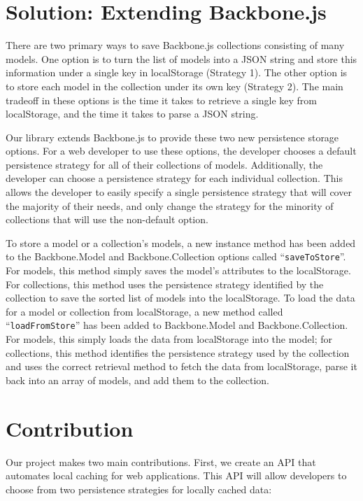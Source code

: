 \documentclass[12pt]{article}
\begin{document}
\section{Solution: Extending Backbone.js}

There are two primary ways to save Backbone.js collections consisting of many
models. One option is to turn the list of models into a JSON string and store
this information under a single key in localStorage (Strategy 1). The other option is to
store each model in the collection under its own key (Strategy 2). The main tradeoff in
these options is the time it takes to retrieve a single key from localStorage,
and the time it takes to parse a JSON string.

Our library extends Backbone.js to provide these two new persistence storage
options. For a web developer to use these options, the developer chooses a
default persistence strategy for all of their collections of models.
Additionally, the developer can choose a persistence strategy for each
individual collection. This allows the developer to easily specify a single
persistence strategy that will cover the majority of their needs, and only
change the strategy for the minority of collections that will use the
non-default option.

To store a model or a collection's models, a new instance method has been added
to the Backbone.Model and Backbone.Collection options called
``\verb=saveToStore=''. For models, this method simply saves the model's
attributes to the localStorage. For collections, this method uses the
persistence strategy identified by the collection to save the sorted list of
models into the localStorage. To load the data for a model or collection from
localStorage, a new method called ``\verb=loadFromStore='' has been added to
Backbone.Model and Backbone.Collection. For models, this simply loads the data
from localStorage into the model; for collections, this method identifies the
persistence strategy used by the collection and uses the correct retrieval
method to fetch the data from localStorage, parse it back into an array of
models, and add them to the collection.

\section{Contribution}

Our project makes two main contributions. First, we create an API that
automates local caching for web applications. This API will allow developers to
choose from two persistence strategies for locally cached data:
\end{document}
